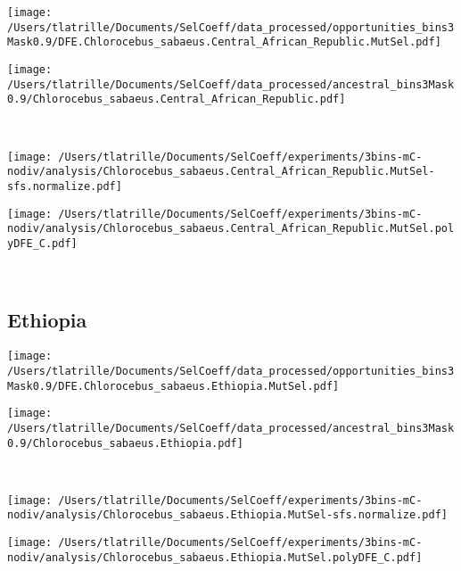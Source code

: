 \documentclass{article}
\begin{document}
    \begin{minipage}{0.49\linewidth}
        \texttt{[image: /Users/tlatrille/Documents/SelCoeff/data\_processed/opportunities\_bins3Mask0.9/DFE.Chlorocebus\_sabaeus.Central\_African\_Republic.MutSel.pdf]}
    \end{minipage}
    \begin{minipage}{0.49\linewidth}
        \texttt{[image: /Users/tlatrille/Documents/SelCoeff/data\_processed/ancestral\_bins3Mask0.9/Chlorocebus\_sabaeus.Central\_African\_Republic.pdf]}
    \end{minipage}
    \\
    \begin{minipage}{0.49\linewidth}
        \texttt{[image: /Users/tlatrille/Documents/SelCoeff/experiments/3bins-mC-nodiv/analysis/Chlorocebus\_sabaeus.Central\_African\_Republic.MutSel-sfs.normalize.pdf]}
    \end{minipage}
    \begin{minipage}{0.49\linewidth}
        \texttt{[image: /Users/tlatrille/Documents/SelCoeff/experiments/3bins-mC-nodiv/analysis/Chlorocebus\_sabaeus.Central\_African\_Republic.MutSel.polyDFE\_C.pdf]}
    \end{minipage}
    \\
    \subsection{Ethiopia}

    \begin{minipage}{0.49\linewidth}
        \texttt{[image: /Users/tlatrille/Documents/SelCoeff/data\_processed/opportunities\_bins3Mask0.9/DFE.Chlorocebus\_sabaeus.Ethiopia.MutSel.pdf]}
    \end{minipage}
    \begin{minipage}{0.49\linewidth}
        \texttt{[image: /Users/tlatrille/Documents/SelCoeff/data\_processed/ancestral\_bins3Mask0.9/Chlorocebus\_sabaeus.Ethiopia.pdf]}
    \end{minipage}
    \\
    \begin{minipage}{0.49\linewidth}
        \texttt{[image: /Users/tlatrille/Documents/SelCoeff/experiments/3bins-mC-nodiv/analysis/Chlorocebus\_sabaeus.Ethiopia.MutSel-sfs.normalize.pdf]}
    \end{minipage}
    \begin{minipage}{0.49\linewidth}
        \texttt{[image: /Users/tlatrille/Documents/SelCoeff/experiments/3bins-mC-nodiv/analysis/Chlorocebus\_sabaeus.Ethiopia.MutSel.polyDFE\_C.pdf]}
    \end{minipage}
    \\
\end{document}
